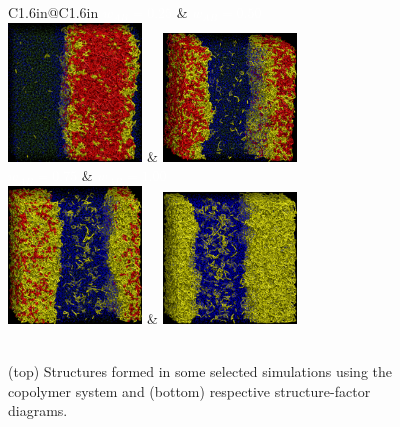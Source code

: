 \documentclass[
journal=mamobx,
manuscript=article,
]{achemso}
\begin{document}
\begin{figure}
	\centering
	\begin{tabular}{C{1.6in}@{}C{1.6in}}
		 \textcolor{white}{$w_{AB}=0.25$} & \textcolor{white}{$w_{AB}=0.50$} \\
		 \includegraphics[width=1.4in]{A1B9_A9B1_025} & \includegraphics[width=1.4in]{A1B9_A9B1_050} \\
		 \textcolor{white}{$w_{AB}=0.75$} & \textcolor{white}{ $w_{AB}=1.00$} \\
		 \includegraphics[width=1.4in]{A1B9_A9B1_075} & \includegraphics[width=1.4in]{A1B9_A9B1_100} \\
		 \\
	\end{tabular}
	\caption{(top) Structures formed in some selected simulations using the  copolymer system and (bottom) respective structure-factor diagrams.}
	\label{fig:Figure_12}
\end{figure}
\end{document}
